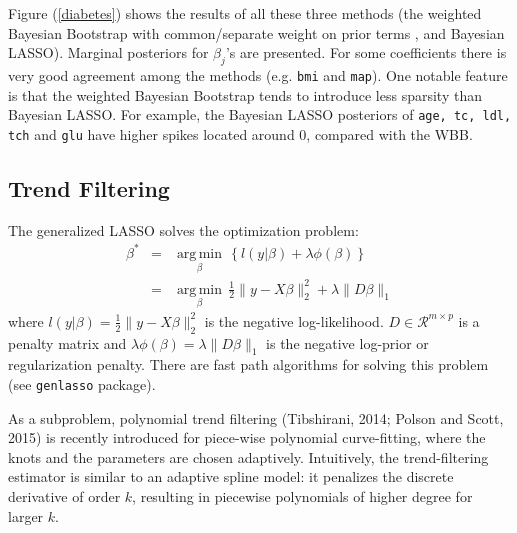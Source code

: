 \documentclass[12pt]{TD-CJS}
\newcommand{\R}{\mathcal{R}}
\DeclareMathOperator*{\argmin}{arg\,min}
\begin{document}
Figure (\ref{diabetes}) shows the results of all these three methods (the weighted Bayesian Bootstrap with common/separate  weight on prior terms , and Bayesian LASSO). Marginal posteriors for $\beta_j$'s are presented. 
For some coefficients there is very good agreement among the methods (e.g. {\tt bmi} and {\tt map}).
 One notable feature is that the weighted Bayesian Bootstrap tends to introduce less sparsity than Bayesian LASSO. For example, the Bayesian LASSO posteriors of {\tt age, tc, ldl, tch} and {\tt glu} have higher spikes located around 0, compared with the WBB.


\subsection{Trend Filtering}
The generalized LASSO solves the optimization problem:
\begin{eqnarray}
\beta^* &=& \underset{\beta}{\argmin} \, \left\{ l(y|\beta) + \lambda\phi(\beta)  \right\}\\
&=& \underset{\beta}{\argmin} \, \frac{1}{2}\|y - X\beta\|_2^2 + \lambda \|D\beta\|_1
\end{eqnarray}
where $ l(y|\beta) = \frac{1}{2}\|y - X\beta\|_2^2 $ is the negative log-likelihood. $D \in \R^{m\times p}$ is a penalty matrix and $ \lambda\phi(\beta) = \lambda \|D\beta\|_1$ is the negative log-prior or regularization penalty. There are fast path algorithms for solving this problem (see {\tt genlasso} package).

As a subproblem, polynomial trend filtering (Tibshirani, 2014; Polson and Scott, 2015) is recently introduced for piece-wise polynomial curve-fitting, where the knots and the parameters are chosen adaptively. Intuitively, the trend-filtering estimator is similar to an adaptive spline model: it penalizes the discrete derivative of order $k$, resulting in piecewise polynomials of higher degree for larger $k$.
\end{document}
